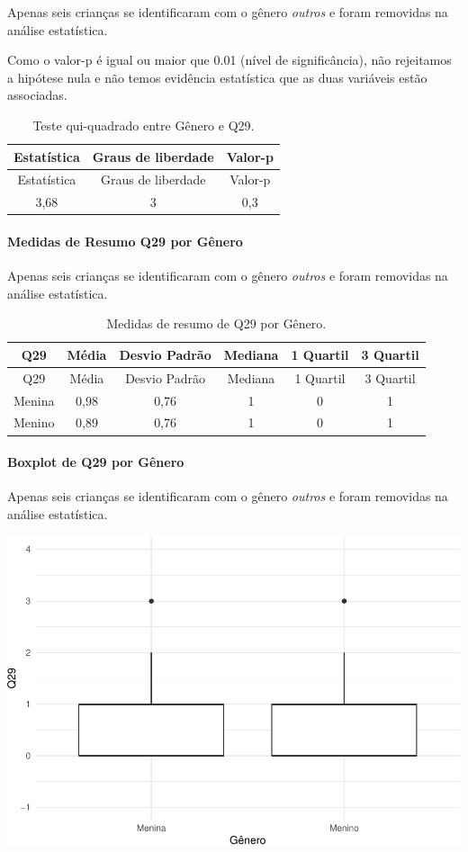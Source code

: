 \documentclass[]{article}
\let\oldparagraph\paragraph
\renewcommand{\paragraph}[1]{\oldparagraph{#1}\mbox{}}
\begin{document}
Apenas seis crianças se identificaram com o gênero \emph{outros} e foram removidas na análise estatística.

Como o valor-p é igual ou maior que 0.01 (nível de significância), não rejeitamos a hipótese nula e não temos evidência estatística que as duas variáveis estão associadas.

\begin{longtable}[]{@{}ccc@{}}
\caption{\label{tab:unnamed-chunk-910}Teste qui-quadrado entre Gênero e Q29.}\tabularnewline
\toprule
Estatística & Graus de liberdade & Valor-p\tabularnewline
\midrule
\endfirsthead
\toprule
Estatística & Graus de liberdade & Valor-p\tabularnewline
\midrule
\endhead
3,68 & 3 & 0,3\tabularnewline
\bottomrule
\end{longtable}

\cleardoublepage

\hypertarget{medidas-de-resumo-q29-por-guxeanero}{%
\paragraph{Medidas de Resumo Q29 por Gênero}\label{medidas-de-resumo-q29-por-guxeanero}}

Apenas seis crianças se identificaram com o gênero \emph{outros} e foram removidas na análise estatística.

\begin{longtable}[]{@{}cccccc@{}}
\caption{\label{tab:unnamed-chunk-911}Medidas de resumo de Q29 por Gênero.}\tabularnewline
\toprule
Q29 & Média & Desvio Padrão & Mediana & 1 Quartil & 3 Quartil\tabularnewline
\midrule
\endfirsthead
\toprule
Q29 & Média & Desvio Padrão & Mediana & 1 Quartil & 3 Quartil\tabularnewline
\midrule
\endhead
Menina & 0,98 & 0,76 & 1 & 0 & 1\tabularnewline
Menino & 0,89 & 0,76 & 1 & 0 & 1\tabularnewline
\bottomrule
\end{longtable}

\hypertarget{boxplot-de-q29-por-guxeanero}{%
\paragraph{Boxplot de Q29 por Gênero}\label{boxplot-de-q29-por-guxeanero}}

Apenas seis crianças se identificaram com o gênero \emph{outros} e foram removidas na análise estatística.

\begin{center}\includegraphics[width=0.75\linewidth]{relatorio_covid19_files/figure-latex/unnamed-chunk-912-1} \end{center}
\end{document}
